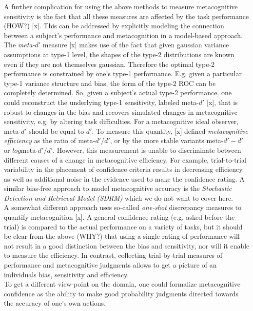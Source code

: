 \documentclass[../main/main.tex]{subfiles}
\begin{document}
	A further complication for using the above methods to measure metacognitive sensitivity is the fact that all these measures are affected by the task performance (HOW?) [x]. This can be addressed by explicitly modeling the connection between a subject's performance and metacognition in a model-based approach. The \textit{meta-$d'$} measure [x] makes use of the fact that given gaussian variance assumptions at type-1 level, the shapes of the type-2 distributions are known even if they are not themselves gaussian. Therefore the optimal type-2 performance is constrained by one's type-1 performance. E.g. given a particular type-1 variance structure and bias, the form of the type-2 ROC can be completely determined. So, given a subject's actual type-2 performance, one could reconstruct the underlying type-1 sensitivity, labeled meta-$d'$ [x], that is robust to changes in the bias and recovers simulated changes in metacognitive sensitivity, e.g. by altering task difficulties. For a metacognitive ideal observer, meta-$d'$ should be equal to $d'$. To measure this quantity, [x] defined \textit{metacognitive efficiency} as the ratio of meta-$d'/d'$, or by the more stable variants meta-$d'-d'$ or $log$meta-$d'/d'$. However, this measurement is unable to discriminate between different causes of a change in metacognitive efficiency. For example,  trial-to-trial variability in the placement of confidence criteria results in decreasing efficiency as well as additional noise in the evidence used to make the confidence rating. A similar bias-free approach to model metacognitive accuracy is the \textit{Stochastic Detection and Retrieval Model (SDRM)} which we do not want to cover here.\\
	A somewhat different approach uses so-called \textit{one-shot} discrepancy measures to quantify metacognition [x]. A general confidence rating (e.g. asked before the trial) is compared to the actual performance on a variety of tasks, but it should be clear from the above (WHY?) that using a single rating of performance will not result in a good distinction between the bias and sensitivity, nor will it enable to measure the efficiency. In contrast, collecting trial-by-trial measures of performance and metacognitive judgments allows to get a picture of an individuals bias, sensitivity and efficiency.\\
	To get a different view-point on the domain, one could formalize metacognitive confidence as the ability to make good probability judgments directed towards the accuracy of one's own actions.
	
\end{document}
